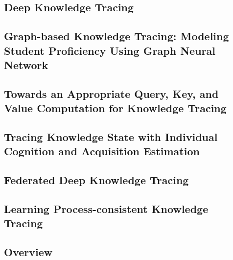 \subsection{Deep Knowledge Tracing}


\subsection{Graph-based Knowledge Tracing: Modeling Student Proficiency Using Graph Neural Network}


\subsection{Towards an Appropriate Query, Key, and Value Computation for Knowledge Tracing}


\subsection{Tracing Knowledge State with Individual Cognition and Acquisition Estimation}


\subsection{Federated Deep Knowledge Tracing}


\subsection{Learning Process-consistent Knowledge Tracing}


\subsection{Overview}
